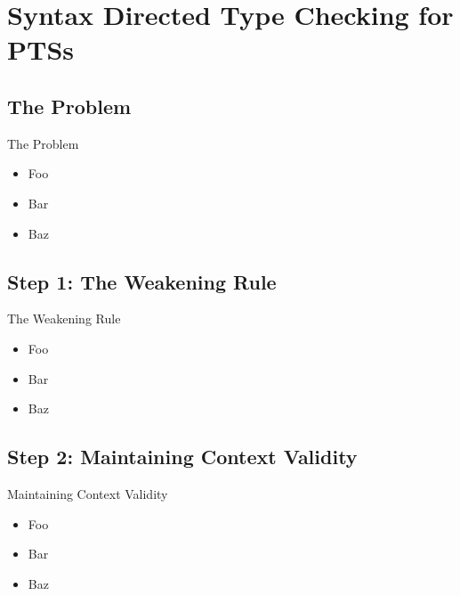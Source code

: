 \documentclass{beamer}
\begin{document}
\section{Syntax Directed Type Checking for PTSs}

\subsection{The Problem}

\begin{frame}{The Problem}

  \begin{itemize}
    \item
      Foo
    \item
      Bar
    \item
      Baz
  \end{itemize}

\end{frame}


\subsection{Step 1: The Weakening Rule}

\begin{frame}{The Weakening Rule}

  \begin{itemize}
    \item
      Foo
    \item
      Bar
    \item
      Baz
  \end{itemize}

\end{frame}


\subsection{Step 2: Maintaining Context Validity}

\begin{frame}{Maintaining Context Validity}

  \begin{itemize}
    \item
      Foo
    \item
      Bar
    \item
      Baz
  \end{itemize}

\end{frame}
\end{document}
